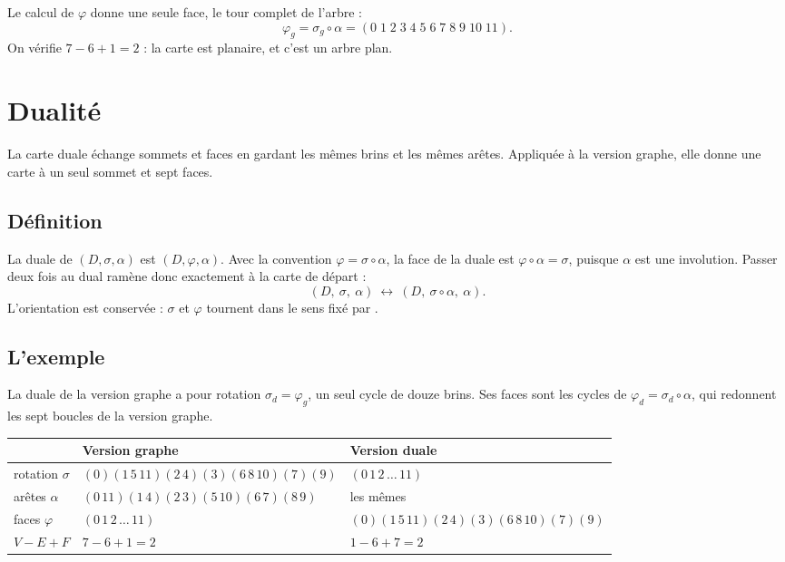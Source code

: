 \documentclass[11pt,a4paper]{article}
\theoremstyle{remark}
\begin{document}
Le calcul de $\varphi$ donne une seule face, le tour complet de l'arbre :
\[
  \varphi_g = \sigma_g\circ\alpha = (0\;1\;2\;3\;4\;5\;6\;7\;8\;9\;10\;11).
\]
On vérifie $7-6+1=2$ : la carte est planaire, et c'est un arbre plan.

\section{Dualité}\label{s:dualite}

La carte duale échange sommets et faces en gardant les mêmes brins et les mêmes
arêtes. Appliquée à la version graphe, elle donne une carte à un seul sommet et
sept faces.

\subsection{Définition}

La duale de $(D,\sigma,\alpha)$ est $(D,\varphi,\alpha)$. Avec la convention
$\varphi=\sigma\circ\alpha$, la face de la duale est
$\varphi\circ\alpha=\sigma$, puisque $\alpha$ est une involution. Passer deux fois
au dual ramène donc exactement à la carte de départ :
\[
  (D,\ \sigma,\ \alpha)\ \longleftrightarrow\ (D,\ \sigma\circ\alpha,\ \alpha).
\]
L'orientation est conservée : $\sigma$ et $\varphi$ tournent dans le sens fixé
par \spin.

\subsection{L'exemple}

La duale de la version graphe a pour rotation $\sigma_d=\varphi_g$, un seul cycle
de douze brins. Ses faces sont les cycles de $\varphi_d=\sigma_d\circ\alpha$, qui
redonnent les sept boucles de la version graphe.

\begin{center}
\begin{tabular}{@{}lll@{}}
  \toprule
  & Version graphe & Version duale \\
  \midrule
  rotation $\sigma$ & $(0)(1\,5\,11)(2\,4)(3)(6\,8\,10)(7)(9)$ & $(0\,1\,2\,\dots\,11)$ \\
  arêtes $\alpha$ & $(0\,11)(1\,4)(2\,3)(5\,10)(6\,7)(8\,9)$ & les mêmes \\
  faces $\varphi$ & $(0\,1\,2\,\dots\,11)$ & $(0)(1\,5\,11)(2\,4)(3)(6\,8\,10)(7)(9)$ \\
  $V-E+F$ & $7-6+1=2$ & $1-6+7=2$ \\
  \bottomrule
\end{tabular}
\end{center}
\end{document}
